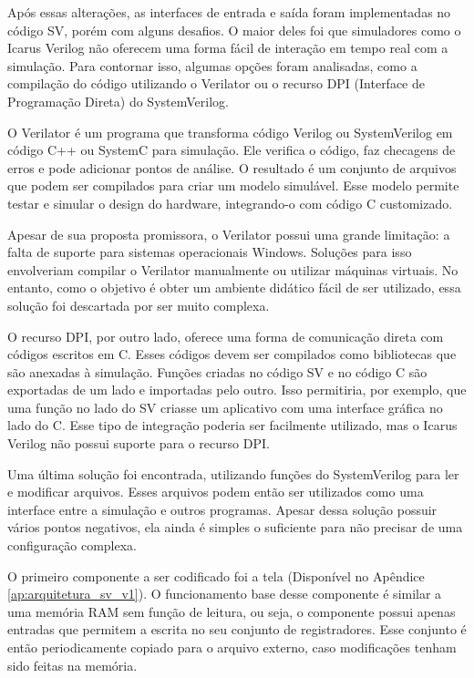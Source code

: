 \documentclass[
	12pt,				%
	openright,			%
	oneside,			%
	a4paper,			%
	english,			%
	french,				%
	spanish,			%
	brazil,				%
	]{abntex2}
\begin{document}
Após essas alterações, as interfaces de entrada e saída foram implementadas no código SV, porém com alguns desafios. O maior deles foi que simuladores como o Icarus Verilog não oferecem uma forma fácil de interação em tempo real com a simulação. Para contornar isso, algumas opções foram analisadas, como a compilação do código utilizando o Verilator ou o recurso DPI (Interface de Programação Direta) do SystemVerilog.

O Verilator \cite{snyder_verilator_2003} é um programa que transforma código Verilog ou SystemVerilog em código C++ ou SystemC para simulação. Ele verifica o código, faz checagens de erros e pode adicionar pontos de análise. O resultado é um conjunto de arquivos que podem ser compilados para criar um modelo simulável. Esse modelo permite testar e simular o design do hardware, integrando-o com código C customizado.

Apesar de sua proposta promissora, o Verilator possui uma grande limitação: a falta de suporte para sistemas operacionais Windows. Soluções para isso envolveriam compilar o Verilator manualmente ou utilizar máquinas virtuais. No entanto, como o objetivo é obter um ambiente didático fácil de ser utilizado, essa solução foi descartada por ser muito complexa.

O recurso DPI, por outro lado, oferece uma forma de comunicação direta com códigos escritos em C. Esses códigos devem ser compilados como bibliotecas que são anexadas à simulação. Funções criadas no código SV e no código C são exportadas de um lado e importadas pelo outro. Isso permitiria, por exemplo, que uma função no lado do SV criasse um aplicativo com uma interface gráfica no lado do C. Esse tipo de integração poderia ser facilmente utilizado, mas o Icarus Verilog não possui suporte para o recurso DPI.

Uma última solução foi encontrada, utilizando funções do SystemVerilog para ler e modificar arquivos. Esses arquivos podem então ser utilizados como uma interface entre a simulação e outros programas. Apesar dessa solução possuir vários pontos negativos, ela ainda é simples o suficiente para não precisar de uma configuração complexa.

O primeiro componente a ser codificado foi a tela (Disponível no Apêndice \ref{ap:arquitetura_sv_v1}). O funcionamento base desse componente é similar a uma memória RAM sem função de leitura, ou seja, o componente possui apenas entradas que permitem a escrita no seu conjunto de registradores. Esse conjunto é então periodicamente copiado para o arquivo externo, caso modificações tenham sido feitas na memória.
\end{document}
